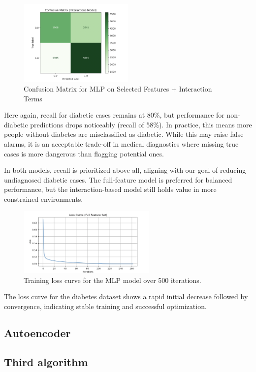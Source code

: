 \begin{figure}[H]
    \centering
    \includegraphics[width=0.5\textwidth]{images/confusion_matrix_interactions.png}
    \caption{Confusion Matrix for MLP on Selected Features + Interaction Terms}
\end{figure}

\noindent
Here again, recall for diabetic cases remains at 80\%, but performance for non-diabetic predictions drops noticeably (recall of 58\%). In practice, this means more people without diabetes are misclassified as diabetic. While this may raise false alarms, it is an acceptable trade-off in medical diagnostics where missing true cases is more dangerous than flagging potential ones.

\vspace{1em}
\noindent
In both models, recall is prioritized above all, aligning with our goal of reducing undiagnosed diabetic cases. The full-feature model is preferred for balanced performance, but the interaction-based model still holds value in more constrained environments.

\begin{figure}[H]
    \centering
    \includegraphics[width=0.6\textwidth]{images/mlp-loss-curve.png} 
    \caption{Training loss curve for the MLP model over 500 iterations.}
    \label{fig:mlp_loss_curve}
    \end{figure}

The loss curve for the diabetes dataset shows a rapid initial decrease followed by convergence, indicating stable training and successful optimization.


\subsection{Autoencoder}

\subsection{Third algorithm}